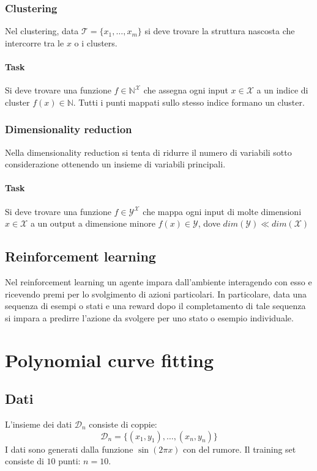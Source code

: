 		\subsubsection{Clustering}
		Nel clustering, data $\mathcal{T}=\{x_1, \dots, x_m\}$ si deve trovare la struttura nascosta che intercorre tra le $x$ o i clusters.

			\paragraph{Task}
			Si deve trovare una funzione $f\in\mathbb{N}^{\mathcal{X}}$ che assegna ogni input $x\in\mathcal{X}$ a un indice di cluster $f(x)\in\mathbb{N}$.
			Tutti i punti mappati sullo stesso indice formano un cluster.

		\subsubsection{Dimensionality reduction}
		Nella dimensionality reduction si tenta di ridurre il numero di variabili sotto considerazione ottenendo un insieme di variabili principali.

			\paragraph{Task}
			Si deve trovare una funzione $f\in\mathcal{Y}^\mathcal{X}$ che mappa ogni input di molte dimensioni $x\in\mathcal{X}$ a un output a dimensione minore $f(x)\in\mathcal{Y}$, dove $dim(\mathcal{Y})\ll dim(\mathcal{X})$

	\subsection{Reinforcement learning}
	Nel reinforcement learning un agente impara dall'ambiente interagendo con esso e ricevendo premi per lo svolgimento di azioni particolari.
	In particolare, data una sequenza di esempi o stati e una reward dopo il completamento di tale sequenza si impara a predirre l'azione da svolgere per uno stato o esempio individuale.

\section{Polynomial curve fitting}

	\subsection{Dati}
	L'insieme dei dati $\mathcal{D}_n$ consiste di coppie:
	$$\mathcal{D}_n = \{(x_1, y_1),\dots,(x_n,y_n)\}$$
	I dati sono generati dalla funzione $\sin(2\pi x)$ con del rumore.
	Il training set consiste di $10$ punti: $n = 10$.

